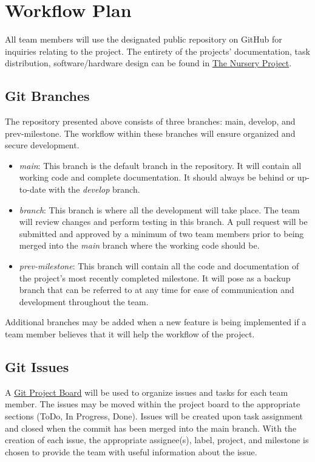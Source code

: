 \documentclass{article}
\begin{document}
	\section{Workflow Plan}
	All team members will use the designated public repository on GitHub 
	for inquiries relating to the project. The entirety of the projects’ 
	documentation, task distribution, software/hardware design can be found 
	in \href{https://github.com/aaronbilly22/The_Nursery_Project}{The Nursery Project}.
	
	\subsection{Git Branches}
	The repository presented above consists of three branches: main, develop, and prev-milestone. 
	The workflow within these branches will ensure organized and secure development.
	\begin{itemize}
		\item \emph{main}: This branch is the default branch in the repository. It will contain all working code and complete documentation. 
		It should always be behind or up-to-date with the \emph{develop} branch.
		\item \emph{branch}: This branch is where all the development will take place.
		 The team will review changes and perform testing in this branch. A pull request 
		 will be submitted and approved by a minimum of two team members prior to being 
		 merged into the \emph{main} branch where the working code should be.
		\item \emph{prev-milestone}: This branch will contain all the code and documentation 
		of the project’s most recently completed milestone. It will pose as a 
		backup branch that can be referred to at any time for ease of communication and 
		development throughout the team.
	\end{itemize}
	Additional branches may be added when a new feature is being implemented if a 
	team member believes that it will help the workflow of the project.

	\subsection{Git Issues}
	A \href{https://github.com/users/aaronbilly22/projects/1}{Git Project Board} will be used to organize 
	issues and tasks for each team member. The issues may be moved within the project board to the 
	appropriate sections (ToDo, In Progress, Done). Issues will be created upon task assignment and closed 
	when the commit has been merged into the main branch. With the creation of each issue, the appropriate assignee(s), label, project, and milestone is chosen
	to provide the team with useful information about the issue.\\
\end{document}
